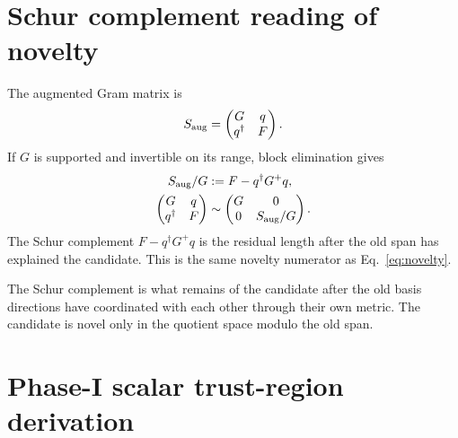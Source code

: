 \documentclass[10pt,twocolumn]{article}
\begin{document}
\section{Schur complement reading of novelty}

The augmented Gram matrix is
\begin{equation}
S_{\rm aug}=
\begin{pmatrix}
G&q\\
q^\dagger&F
\end{pmatrix}.
\label{eq:aug_gram}
\end{equation}
If \(G\) is supported and invertible on its range, block elimination gives
\begin{equation}
\begin{aligned}
S_{\rm aug}/G
&:=F-q^\dagger G^+q,\\
\begin{pmatrix}G&q\\q^\dagger&F\end{pmatrix}
&\sim
\begin{pmatrix}G&0\\0&S_{\rm aug}/G\end{pmatrix}.
\end{aligned}
\label{eq:schur_novelty}
\end{equation}
The Schur complement \(F-q^\dagger G^+q\) is the residual length after the old span has explained the candidate. This is the same novelty numerator as Eq.~\eqref{eq:novelty}.

\begin{intuitionbox}
The Schur complement is what remains of the candidate after the old basis directions have coordinated with each other through their own metric. The candidate is novel only in the quotient space modulo the old span.
\end{intuitionbox}

\section{Phase-I scalar trust-region derivation}
\end{document}
